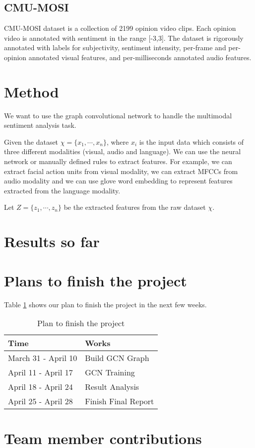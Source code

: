 \documentclass[11pt]{article}
\begin{document}
\subsection{CMU-MOSI}
CMU-MOSI dataset is a collection of 2199 opinion video clips. Each opinion video is annotated with sentiment in the range [-3,3]. The dataset is rigorously annotated with labels for subjectivity, sentiment intensity, per-frame and per-opinion annotated visual features, and per-milliseconds annotated audio features.

\section{Method}

We want to use the graph convolutional network to handle the multimodal sentiment analysis task.

Given the dataset $\chi = \{x_1,\cdots,x_n \}$, where $x_i$ is the input data which consists of three different modalities (visual, audio and language). We can use the neural network or manually defined rules to extract features. For example, we can extract facial action units from visual modality, we can extract MFCCs from audio modality and we can use glove word embedding to represent features extracted from the language modality.

Let $Z = \{z_1,\cdots,z_n \}$ be the extracted features from the raw dataset $\chi$.

\section{Results so far}

\section{Plans to finish the project}

Table \ref{plan} shows our plan to finish the project in the next few weeks.

\begin{table}[]
\begin{tabular}{|l|l|}
\hline
\textbf{Time}       & \textbf{Works}               \\ \hline
March 31 - April 10 & Build GCN Graph     \\ \hline
April 11 - April 17 & GCN Training        \\ \hline
April 18 - April 24 & Result Analysis     \\ \hline
April 25 - April 28 & Finish Final Report \\ \hline
\end{tabular}
\caption{\label{plan} Plan to finish the project }
\end{table}

\cite{zadeh2018multimodal}
\section{Team member contributions}




\end{document}

